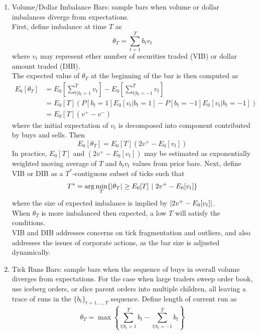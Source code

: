 \begin{remark}
\begin{enumerate}[label=\roman*.]
\item Volume/Dollar Imbalance Bars: sample bars when volume or dollar imbalances diverge from expectations.\\
First, define imbalance at time $T$ as
\begin{equation}
\theta_T = \sum\limits_{t=1}^T b_t v_t \nonumber
\end{equation}
where $v_t$ may represent ether number of securities traded (VIB) or dollar amount traded (DIB).\\
The expected value of $\theta_T$ at the beginning of the bar is then computed as
\begin{align}
E_0[\theta_T] &= E_0 \left[ \sum\limits_{t \vert b_t = 1}^T v_t \right] - E_0 \left[ \sum\limits_{t \vert b_t = -1}^T v_t \right] \nonumber \\
&= E_0[T] (P[b_t = 1]E_0[v_t \vert b_t = 1] - P[b_t = -1]E_0[v_t \vert b_t = -1]) \nonumber \\
&= E_0[T] (v^+ - v^-) \nonumber
\end{align}
where the initial expectation of $v_t$ is decomposed into component contributed by buys and sells. Then
\begin{equation}
E_0[\theta_T] = E_0[T] (2v^+ - E_0 [v_t]) \nonumber
\end{equation}
In practice, $E_0[T]$ and $(2v^+ - E_0 [v_t])$ may be estimated as exponentially weighted moving average of $T$ and $b_t v_t$ values from prior bars. Next, define VIB or DIB as a $T^*$-contiguous subset of ticks such that
\begin{equation}
T^* = \arg \min_T \{ \left\lvert\theta_T\right\rvert \geq E_0[T] \ \vert \ 2v^+ - E_0[v_t] \} \nonumber
\end{equation}
where the size of expected imbalance is implied by $\left\lvert2v^+ - E_0[v_t]\right\rvert$.\\
When $\theta_T$ is more imbalanced then expected, a low $T$ will satisfy the conditions.\\
VIB and DIB addresses concerns on tick fragmentation and outliers, and also addresses the issues of corporate actions, as the bar size is adjusted dynamically.
\item Tick Runs Bars: sample bars when the sequence of buys in overall volume diverges from expectations. For the case when large traders sweep order book, use iceberg orders, or slice parent orders into multiple children, all leaving a trace of runs in the $\{b_t\}_{t = 1, \ldots, T}$ sequence. Define length of current run as
\begin{equation}
\theta_T = \max \left\{ \sum\limits_{t \vert b_t = 1}^T b_t - \sum\limits_{t \vert b_t = -1}^T b_t  \right\} \nonumber

\end{equation}
\end{enumerate}
\end{remark}
